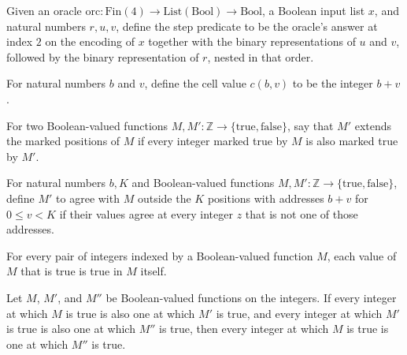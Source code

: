 \begin{definition}
\label{Complexity.LogProg.ExpBFS.stp}
\leanok
{}
Given an oracle
$\mathrm{orc}:\mathrm{Fin}(4)\to\mathrm{List}(\mathrm{Bool})\to\mathrm{Bool}$, a Boolean
input list $x$, and natural numbers $r,u,v$, define the step predicate to be the
oracle's answer at index $2$ on the encoding of $x$ together with the binary
representations of $u$ and $v$, followed by the binary representation of $r$, nested in
that order.
\end{definition}

\begin{definition}
\label{Complexity.LogProg.ExpBFS.cell}
\leanok
For natural numbers $b$ and $v$, define the cell value $c(b,v)$ to be the integer $b+v$.
\end{definition}

\begin{definition}
\label{Complexity.LogProg.ExpBFS.Mono}
\leanok
For two Boolean-valued functions $M,M':\mathbb{Z}\to\{\mathrm{true},\mathrm{false}\}$,
say that $M'$ extends the marked positions of $M$ if every integer marked true by $M$ is
also marked true by $M'$.
\end{definition}

\begin{definition}
\label{Complexity.LogProg.ExpBFS.Out}
\leanok
{}
For natural numbers $b,K$ and Boolean-valued functions
$M,M':\mathbb{Z}\to\{\mathrm{true},\mathrm{false}\}$, define $M'$ to agree with $M$
outside the $K$ positions with addresses $b+v$ for $0\le v<K$ if their values agree at
every integer $z$ that is not one of those addresses.
\end{definition}

\begin{lemma}
\label{Complexity.LogProg.ExpBFS.Mono.refl}
\leanok
{}
For every pair of integers indexed by a Boolean-valued function $M$, each value of $M$
that is true is true in $M$ itself.
\end{lemma}

\begin{lemma}
\label{Complexity.LogProg.ExpBFS.Mono.trans}
\leanok
{}
Let $M$, $M'$, and $M''$ be Boolean-valued functions on the integers. If every integer
at which $M$ is true is also one at which $M'$ is true, and every integer at which $M'$
is true is also one at which $M''$ is true, then every integer at which $M$ is true is
one at which $M''$ is true.
\end{lemma}

